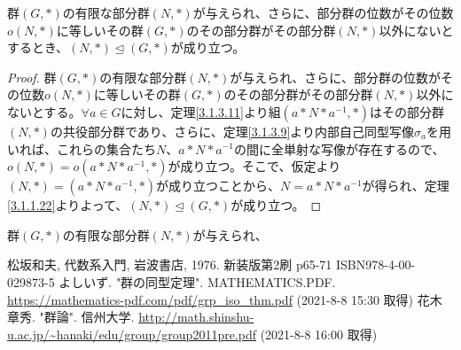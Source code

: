 \documentclass[dvipdfmx]{jsarticle}
\begin{document}
\begin{thm}\label{3.1.3.14}
群$(G,*)$の有限な部分群$(N,*)$が与えられ、さらに、部分群の位数がその位数$o(N,*)$に等しいその群$(G,*)$のその部分群がその部分群$(N,*)$以外にないとするとき、$(N,*) \trianglelefteq (G,*)$が成り立つ。
\end{thm}
\begin{proof}
群$(G,*)$の有限な部分群$(N,*)$が与えられ、さらに、部分群の位数がその位数$o(N,*)$に等しいその群$(G,*)$のその部分群がその部分群$(N,*)$以外にないとする。$\forall a \in G$に対し、定理\ref{3.1.3.11}より組$\left( a*N*a^{- 1},* \right)$はその部分群$(N,*)$の共役部分群であり、さらに、定理\ref{3.1.3.9}より内部自己同型写像$\sigma_{a}$を用いれば、これらの集合たち$N$、$a*N*a^{- 1}$の間に全単射な写像が存在するので、$o(N,*) = o\left( a*N*a^{- 1},* \right)$が成り立つ。そこで、仮定より$(N,*) = \left( a*N*a^{- 1},* \right)$が成り立つことから、$N = a*N*a^{- 1}$が得られ、定理\ref{3.1.1.22}よりよって、$(N,*) \trianglelefteq (G,*)$が成り立つ。
\end{proof}
\begin{thm}\label{3.1.3.15}
群$(G,*)$の有限な部分群$(N,*)$が与えられ、
\end{thm}
\begin{thebibliography}{50}
  松坂和夫, 代数系入門, 岩波書店, 1976. 新装版第2刷 p65-71 ISBN978-4-00-029873-5
  よしいず. "群の同型定理". MATHEMATICS.PDF. \url{https://mathematics-pdf.com/pdf/grp_iso_thm.pdf} (2021-8-8 15:30 取得)
  花木章秀. "群論". 信州大学. \url{http://math.shinshu-u.ac.jp/~hanaki/edu/group/group2011pre.pdf} (2021-8-8 16:00 取得)
\end{thebibliography}
\end{document}
